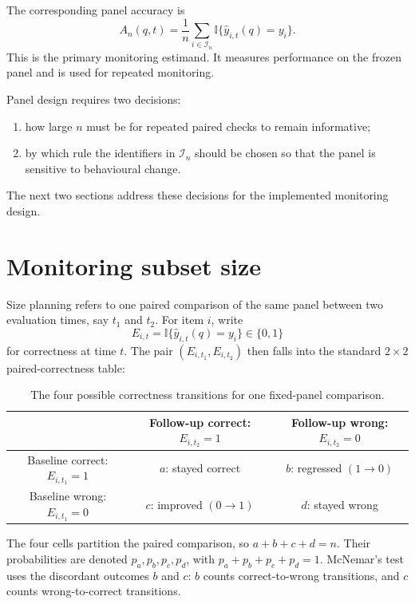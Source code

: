 The corresponding panel accuracy is
\begin{equation}
    A_n(q,t)
    =
    \frac{1}{n}
    \sum_{i\in\mathcal{I}_n}
    \mathbb{I}\{\hat y_{i,t}(q)=y_i\}.
    \label{eq:finite-panel-accuracy}
\end{equation}
This is the primary monitoring estimand. It measures performance on the frozen panel and is used for repeated monitoring.

Panel design requires two decisions:
\begin{enumerate}
    \item how large \(n\) must be for repeated paired checks to remain informative;
    \item by which rule the identifiers in \(\mathcal{I}_n\) should be chosen so that the panel is sensitive to behavioural change.
\end{enumerate}
The next two sections address these decisions for the implemented monitoring design.

\section{Monitoring subset size}
\label{sec:monitoring-sample-size}

Size planning refers to one paired comparison of the same panel between two evaluation times, say \(t_1\) and \(t_2\). For item \(i\), write
\[
E_{i,t}=\mathbb{I}\{\hat y_{i,t}(q)=y_i\}\in\{0,1\}
\]
for correctness at time \(t\). The pair \((E_{i,t_1},E_{i,t_2})\) then falls into the standard \(2\times2\) paired-correctness table:

\begin{table}[H]
    \centering
    \caption[Paired correctness table for size planning]{The four possible correctness transitions for one fixed-panel comparison.}
    \label{tab:mcnemar_contingency_design}
    \begin{tabular}{c|cc}
        & Follow-up correct: \(E_{i,t_2}=1\)
        & Follow-up wrong: \(E_{i,t_2}=0\) \\
        \hline
        Baseline correct: \(E_{i,t_1}=1\)
        & \(a\): stayed correct
        & \(b\): regressed \((1\to0)\) \\
        Baseline wrong: \(E_{i,t_1}=0\)
        & \(c\): improved \((0\to1)\)
        & \(d\): stayed wrong
    \end{tabular}
\end{table}

The four cells partition the paired comparison, so \(a+b+c+d=n\). Their probabilities are denoted \(p_a,p_b,p_c,p_d\), with \(p_a+p_b+p_c+p_d=1\). McNemar's test uses the discordant outcomes \(b\) and \(c\): \(b\) counts correct-to-wrong transitions, and \(c\) counts wrong-to-correct transitions.

